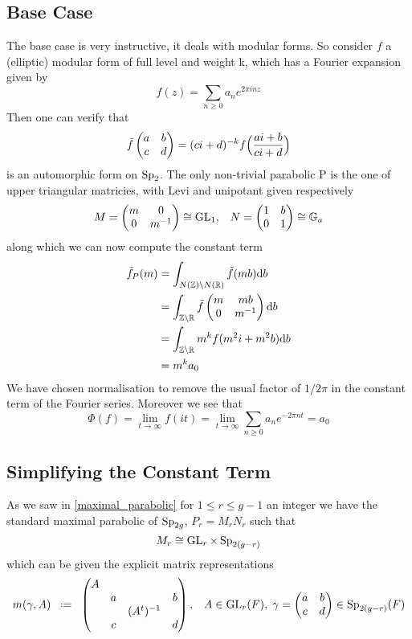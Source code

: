 \subsection{Base Case}
The base case is very instructive, it deals with modular forms. So consider \(f\) a (elliptic) modular form of full level and weight k, which has a Fourier expansion given by 
\[f(z) = \sum_{n\geq 0} a_ne^{2\pi i nz }\]
Then one can verify that
\[\tilde f \begin{pmatrix}
	a & b\\
	c & d
\end{pmatrix} = (ci+d)^{-k} f\Bigl(\frac{ai+b}{ci+d}\Bigr)\]
is an automorphic form on \(\operatorname{Sp}_2\). The only non-trivial parabolic P is the one of upper triangular matricies, with Levi and unipotant given respectively 
\[M = \begin{pmatrix} m & 0\\ 0 & m^{-1}\end{pmatrix}\cong \operatorname{GL}_1 , \;\;\; N = \begin{pmatrix} 1 & b\\ 0 & 1\end{pmatrix} \cong \mathbb{G}_a\]
along which we can now compute the constant term 
\begin{equation*}
	\begin{aligned}
		\tilde f_P(m)
		& = \int_{N(\Z)\backslash N(\R)}\tilde f (mb) \mathrm{d}b\\
		& =  \int_{\Z\backslash\R}\tilde f \begin{pmatrix} m & mb\\ 0 & m^{-1}\end{pmatrix}\mathrm{d}b\\
		& = \int_{\Z\backslash\R} m^k f(m^2i+m^2b) \mathrm{d}b\\
		& = m^k a_0 \\
	\end{aligned}
\end{equation*}
We have chosen normalisation to remove the usual factor of \(1/2\pi\) in the constant term of the Fourier series. Moreover we see that
\[\Phi(f)= \lim_{t\to \infty} f(it) =\lim_{t\to \infty} \sum_{n\geq 0} a_ne^{-2\pi nt }  =  a_0\]

\subsection{Simplifying the Constant Term}
As we saw in \ref{maximal_parabolic} for \(1\leq r\leq g-1\) an integer we have the standard maximal parabolic of \(\operatorname{Sp}_{2g}\), \(P_r = M_rN_r\) such that 
\[M_r \cong \operatorname{GL}_r\times \operatorname{Sp}_{2(g-r)}\]
which can be given the explicit matrix representations 
\[m(\gamma, A) \defeq \begin{pmatrix}
	A &&& \\
	&a&&b \\
	&&(A^t)\inv& \\
	&c&&d \\
\end{pmatrix}, \;\;\; A\in \GL_r(F), \; \gamma = \begin{pmatrix}
	a & b\\
	c & d \\
\end{pmatrix} \in \Sp_{2(g-r)}(F) \]

